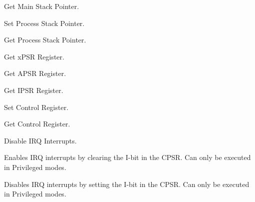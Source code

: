 Get Main Stack Pointer.

Set Process Stack Pointer.

Get Process Stack Pointer.

Get x\+P\+SR Register.

Get A\+P\+SR Register.

Get I\+P\+SR Register.

Set Control Register.

Get Control Register.

Disable I\+RQ Interrupts.

Enables I\+RQ interrupts by clearing the I-\/bit in the C\+P\+SR. Can only be executed in Privileged modes.

Disables I\+RQ interrupts by setting the I-\/bit in the C\+P\+SR. Can only be executed in Privileged modes.

